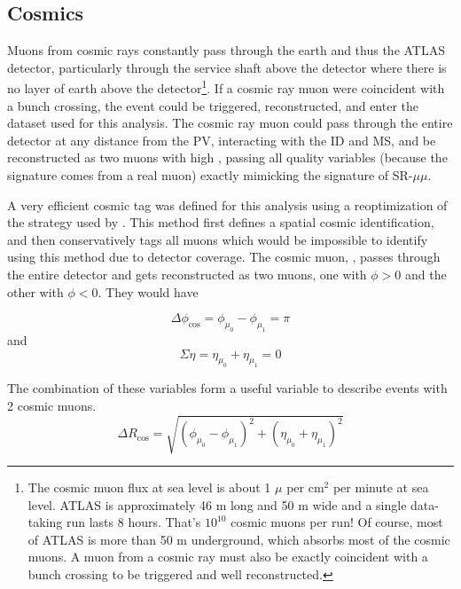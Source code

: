 \subsection{Cosmics}
\label{sec:cosmics}
Muons from cosmic rays constantly pass through the earth and thus the \ac{ATLAS} detector, particularly through the service shaft above the detector where there is no layer of earth above the detector\footnote{The cosmic muon flux at sea level is about 1 $\mu$ per cm$^2$ per minute at sea level. ATLAS is approximately 46 m long and 50 m wide and a single data-taking run lasts 8 hours. That's $10^{10}$ cosmic muons per run! Of course, most of \ac{ATLAS} is more than 50 m underground, which absorbs most of the cosmic muons. A muon from a cosmic ray must also be exactly coincident with a bunch crossing to be triggered and well reconstructed. }. If a cosmic ray muon were coincident with a bunch crossing, the event could be triggered, reconstructed, and enter the dataset used for this analysis. The cosmic ray muon could pass through the entire detector at any distance from the \ac{PV}, interacting with the \ac{ID} and \ac{MS}, and be reconstructed as two muons with high \absdz, passing all quality variables (because the signature comes from a real muon) exactly mimicking the signature of SR-$\mu\mu$. 

A very efficient cosmic tag was defined for this analysis using a reoptimization of the strategy used by \cite{ATLAS-CONF-2019-006}.  This method first defines a spatial cosmic identification, and then conservatively tags all muons which would be impossible to identify using this method due to detector coverage. The cosmic muon, \mcos, passes through the entire detector and gets reconstructed as two muons, one with $\phi > 0$ and the other with $\phi < 0$. They would have 

\begin{equation}
\Delta \phi_{\text{cos}} = \phi_{\mu_{0}} - \phi_{\mu_{1}} = \pi 
\end{equation}
and 
\begin{equation}
\Sigma \eta = \eta_{\mu_{0}} + \eta_{\mu_{1}} = 0
\end{equation} 

The combination of these variables form a useful variable to describe events with 2 cosmic muons.
\begin{equation}
\Delta R_{\text{cos}} = \sqrt{ (\phi_{\mu_{0}} - \phi_{\mu_{1}})^{2} + (\eta_{\mu_{0}} + \eta_{\mu_{1}})^2}
\end{equation}


